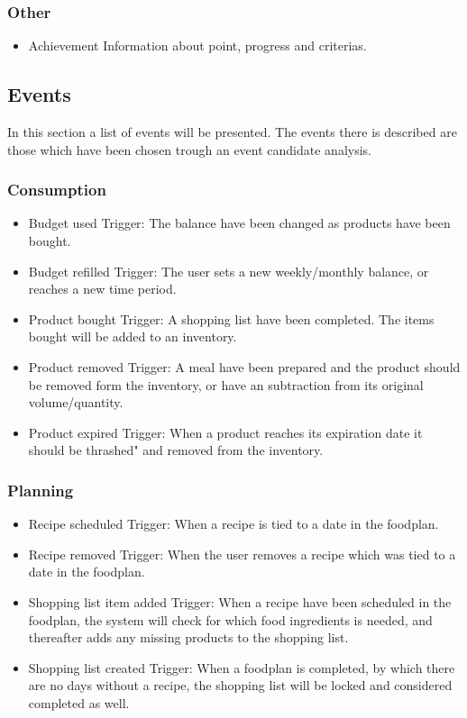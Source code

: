 \subsubsection{Other}
\begin{itemize}
\item Achievement
    \subitem Information about point, progress and criterias. %
\end{itemize}

\subsection{Events}
In this section a list of events will be presented. The events there is described are those which have been chosen trough an event candidate analysis.
\subsubsection{Consumption}
\begin{itemize}
\item Budget used
    \subitem Trigger: The balance have been changed as products have been bought.
\item Budget refilled
    \subitem Trigger: The user sets a new weekly/monthly balance, or reaches a new time period.
\item Product bought
    \subitem Trigger: A shopping list have been completed. The items bought will be added to an inventory.
\item Product removed
    \subitem Trigger: A meal have been prepared and the product should be removed form the inventory, or have an subtraction from its original volume/quantity.
\item Product expired
    \subitem Trigger: When a product reaches its expiration date it should be thrashed" and removed from the inventory.
\end{itemize}

\subsubsection{Planning}
\begin{itemize}
    \item Recipe scheduled
        \subitem Trigger: When a recipe is tied to a date in the foodplan.
    \item Recipe removed
        \subitem Trigger: When the user removes a recipe which was tied to a date in the foodplan.
    \item Shopping list item added
        \subitem Trigger: When a recipe have been scheduled in the foodplan, the system will check for which food ingredients is needed, and thereafter adds any missing products to the shopping list.
    \item Shopping list created
        \subitem Trigger: When a foodplan is completed, by which there are no days without a recipe, the shopping list will be locked and considered completed as well.
\end{itemize}

